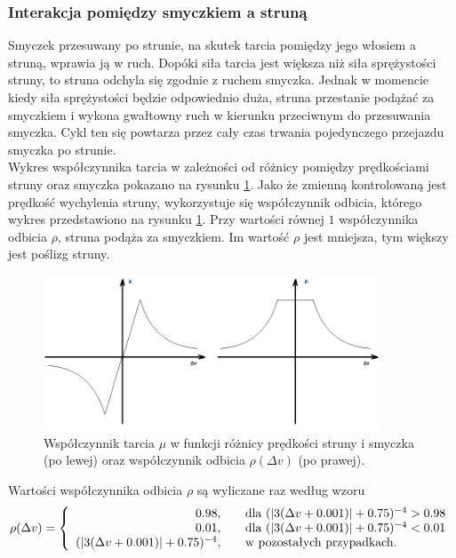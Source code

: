 \subsubsection{Interakcja pomiędzy smyczkiem a struną}
Smyczek przesuwany po strunie, na skutek tarcia pomiędzy jego włosiem a struną, wprawia ją w ruch. Dopóki siła tarcia jest większa niż siła sprężystości struny, to struna odchyla się zgodnie z ruchem smyczka. Jednak w momencie kiedy siła sprężystości będzie odpowiednio duża, struna przestanie podążać za smyczkiem i wykona gwałtowny ruch w kierunku przeciwnym do przesuwania smyczka.  Cykl ten się powtarza przez cały czas trwania pojedynczego przejazdu smyczka po strunie.  \\
Wykres współczynnika tarcia w zależności od różnicy pomiędzy prędkościami struny oraz smyczka pokazano na rysunku \ref{rys:tarcie}. Jako że zmienną kontrolowaną jest prędkość wychylenia struny, wykorzystuje się współczynnik odbicia, którego wykres przedstawiono na rysunku \ref{rys:tarcie}. Przy wartości równej $1$ współczynnika odbicia $\rho$, struna podąża za smyczkiem. Im wartość $\rho$ jest mniejsza, tym większy jest poślizg struny.
\begin{figure}[H]
	\centering
	\includegraphics[width=10cm]{grafiki/tarcie2}
	\captionsetup{justification=centering}
	\caption{Współczynnik tarcia $\mu$ w funkcji różnicy prędkości struny i smyczka (po lewej) oraz współczynnik odbicia $\rho(\Delta v)$ (po prawej).}
	\label{rys:tarcie}
\end{figure}
Wartości współczynnika odbicia $\rho$ są wyliczane raz według wzoru
\begin{equation} \label{equ:model_wsp_odbicia}
\rho(\Delta v) = \left \{\begin{array}{ r l }
0.98, & \quad \text{dla } (|3 (\Delta v + 0.001) | + 0.75)^{-4} > 0.98\\
0.01, & \quad  \text{dla } (|3 (\Delta v + 0.001) | + 0.75)^{-4} < 0.01\\
(|3 (\Delta v + 0.001) | + 0.75)^{-4}, & \quad \text{w pozostałych przypadkach.}
\end{array}
\right.
\end{equation}
